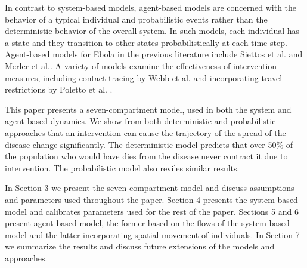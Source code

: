 In contrast to system-based models, agent-based models are concerned with the behavior of a typical individual and probabilistic events rather than the deterministic behavior of the overall system. In such models, each individual has a state and they transition to other states probabilistically at each time step. Agent-based models for Ebola in the previous literature include Siettos et al. \cite{Siettos2015} and Merler et al.\cite{Merler2015}. A variety of models examine the effectiveness of intervention measures, including contact tracing by Webb et al. \cite{Webb2015} and incorporating travel restrictions by Poletto et al. \cite{Poletto2014}.

This paper presents a seven-compartment model, used in both the system and agent-based dynamics. We show from both deterministic and probabilistic approaches that an intervention can cause the trajectory of the spread of the disease change significantly. The deterministic model predicts that over 50\% of the population who would have dies from the disease never contract it due to intervention. The probabilistic model also reviles similar results.

In Section 3 we present the seven-compartment model and discuss assumptions and parameters used throughout the paper. Section 4 presents the system-based model and calibrates parameters used for the rest of the paper. Sections 5 and 6 present agent-based model, the former based on the flows of the system-based model and the latter incorporating spatial movement of individuals. In Section 7  we summarize the results and discuss future extensions of the models and approaches. 